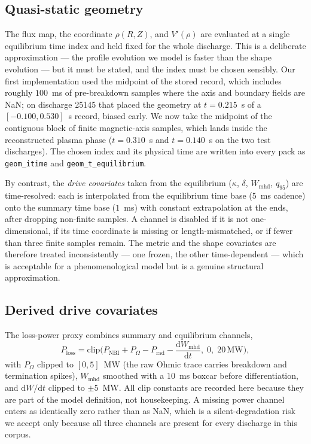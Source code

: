 \subsection{Quasi-static geometry}
\label{app:eq-quasistatic}

The flux map, the coordinate $\rho(R,Z)$, and $V'(\rho)$ are evaluated at a
single equilibrium time index and held fixed for the whole discharge. This
is a deliberate approximation --- the profile evolution we model is faster
than the shape evolution --- but it must be stated, and the index must be
chosen sensibly. Our first implementation used the midpoint of the stored
record, which includes roughly $100$~ms of pre-breakdown samples where the
axis and boundary fields are NaN; on discharge 25145 that placed the
geometry at $t = 0.215$~s of a $[-0.100, 0.530]$~s record, biased early.
We now take the midpoint of the contiguous block of finite magnetic-axis
samples, which lands inside the reconstructed plasma phase ($t = 0.310$~s
and $t = 0.140$~s on the two test discharges). The chosen index and its
physical time are written into every pack as \texttt{geom\_itime} and
\texttt{geom\_t\_equilibrium}.

By contrast, the \emph{drive covariates} taken from the equilibrium
($\kappa$, $\delta$, $W_{\mathrm{mhd}}$, $q_{95}$) are time-resolved: each
is interpolated from the equilibrium time base ($5$~ms cadence) onto the
summary time base ($1$~ms) with constant extrapolation at the ends, after
dropping non-finite samples. A channel is disabled if it is not
one-dimensional, if its time coordinate is missing or length-mismatched, or
if fewer than three finite samples remain. The metric and the shape
covariates are therefore treated inconsistently --- one frozen, the other
time-dependent --- which is acceptable for a phenomenological model but is
a genuine structural approximation.

\subsection{Derived drive covariates}
\label{app:eq-covariates}

The loss-power proxy combines summary and equilibrium channels,
\begin{equation}
P_{\mathrm{loss}} = \mathrm{clip}\Big(
P_{\mathrm{NBI}} + P_{\Omega} - P_{\mathrm{rad}} - \frac{\mathrm{d}W_{\mathrm{mhd}}}{\mathrm{d}t},
\;0,\; 20\,\mathrm{MW}\Big),
\label{eq:ploss}
\end{equation}
with $P_{\Omega}$ clipped to $[0, 5]$~MW (the raw Ohmic trace carries
breakdown and termination spikes), $W_{\mathrm{mhd}}$ smoothed with a
$10$~ms boxcar before differentiation, and
$\mathrm{d}W/\mathrm{d}t$ clipped to $\pm 5$~MW. All clip constants are
recorded here because they are part of the model definition, not
housekeeping. A missing power channel enters as identically zero rather
than as NaN, which is a silent-degradation risk we accept only because all
three channels are present for every discharge in this corpus.

